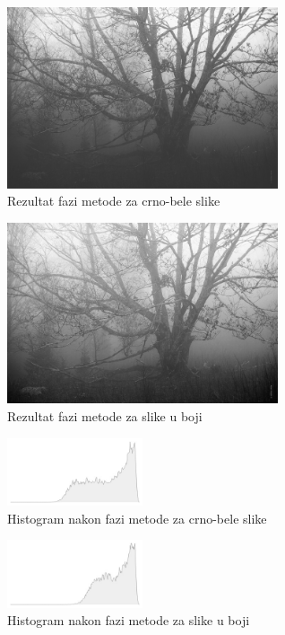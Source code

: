 \documentclass[12pt,a4paper]{article}
\theoremstyle{definition}
\theoremstyle{remark}
\theoremstyle{plain}
\begin{document}
\begin{multicols}{2}
\begin{figure}[H]
\centering
\includegraphics[width=8cm]{images/fuzzy_grayscale_0.jpg}
  \caption{Rezultat fazi metode za crno-bele slike}\label{river2}
\end{figure}
\columnbreak
\begin{figure}[H]
\centering
\includegraphics[width=8cm]{images/fuzzy_color_3.jpg}
  \caption{Rezultat fazi metode za slike u boji}\label{river_output3}
\end{figure}
\end{multicols}

\begin{multicols}{2}
\begin{figure}[H]
\centering
\includegraphics[width=4cm]{images/tree_gr.jpg}
  \caption{Histogram nakon fazi metode za crno-bele slike}
\end{figure}
\columnbreak
\begin{figure}[H]
\centering
\includegraphics[width=4cm]{images/tree_color.jpg}
  \caption{Histogram nakon fazi metode za slike u boji}
\end{figure}
\end{multicols}
\end{document}
